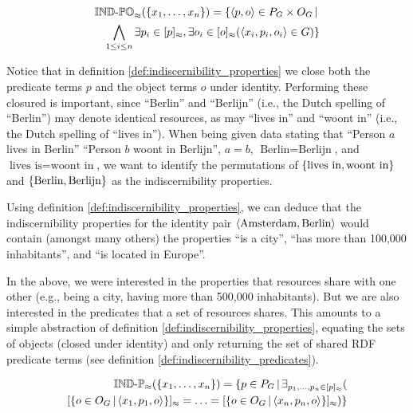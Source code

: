 \begin{definition}
\label{def:indiscernibility_properties}
\begin{align}
  \operatorname{{\mathbb{IND}-\mathbb{PO}}}_{\approx}(\{x_1,\ldots,x_n\})
=
  \{
    \langle p,o\rangle \in P_G \times O_G
  \,\vert\,\nonumber\\
    \bigwedge_{1 \leq i \leq n}
      \exists p_i \in [p]_{\approx},
        \exists o_i \in [o]_{\approx}(
          \langle x_i,p_i,o_i\rangle \in G
        )
  \}\nonumber
\end{align}
\end{definition}

\noindent Notice that in definition \ref{def:indiscernibility_properties}
  we close both the predicate terms $p$ and the object terms $o$
  under identity.
Performing these closured is important,
  since ``Berlin'' and ``Berlijn'' (i.e., the Dutch spelling of ``Berlin'')
  may denote identical resources, as may ``lives in'' and ``woont in''
  (i.e., the Dutch spelling of ``lives in'').
When being given data stating that ``Person $a$ lives in Berlin''
  ``Person $b$ woont in Berlijn'', $a = b$, $\text{Berlin} = \text{Berlijn}$,
  and $\text{lives is} = \text{woont in}$,
  we want to identify the permutations of
  $\{\text{lives in},\text{woont in}\}$ and
  $\{\text{Berlin},\text{Berlijn}\}$
  as the indiscernibility properties.

Using definition \ref{def:indiscernibility_properties},
  we can deduce that the indiscernibility properties for
  the identity pair $\langle\text{Amsterdam},\text{Berlin}\rangle$
  would contain (amongst many others) the properties
  ``is a city'', ``has more than 100,000 inhabitants'', and
  ``is located in Europe''.

In the above, we were interested in the properties that resources share
  with one other (e.g., being a city, having more than 500,000 inhabitants).
But we are also interested in the predicates that a set of resources shares.
This amounts to a simple abstraction of
  definition \ref{def:indiscernibility_properties},
  equating the sets of objects (closed under identity)
  and only returning the set of shared RDF predicate terms
  (see definition \ref{def:indiscernibility_predicates}).

\small
\begin{definition}
\label{def:indiscernibility_predicates}
\begin{align}
  \indp_{\approx}(\setrange{x_1}{x_n})
=
  \setdef{
    p \in P_G
  }{
    \exists_{\range{p_1}{p_n} \in \equivset{p}}(\nonumber\\
        \equivset{
          \setdef{
            o \in O_G
          }{
            \triple{x_1}{p_1}{o}
          }
        }
      =
        \ldots
      =
        \equivset{
          \setdef{
            o \in O_G
          }{
            \triple{x_n}{p_n}{o}
          }
        }
    )
  }\nonumber
\end{align}
\end{definition}
\normalsize

